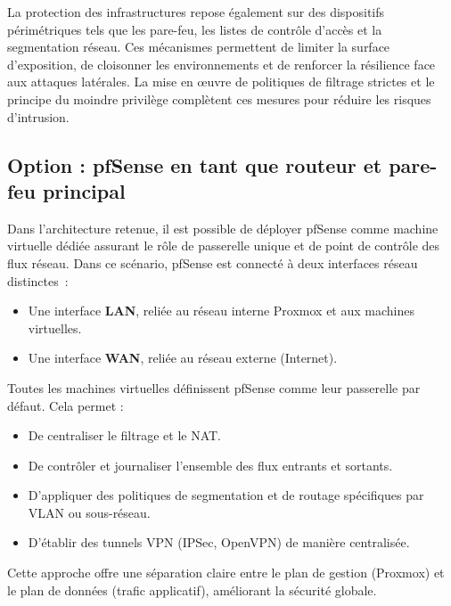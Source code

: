 La protection des infrastructures repose également sur des dispositifs périmétriques tels que les pare-feu, les listes de contrôle d’accès et la segmentation réseau. Ces mécanismes permettent de limiter la surface d’exposition, de cloisonner les environnements et de renforcer la résilience face aux attaques latérales. La mise en œuvre de politiques de filtrage strictes et le principe du moindre privilège complètent ces mesures pour réduire les risques d’intrusion.

\subsection{Option : pfSense en tant que routeur et pare-feu principal}

Dans l’architecture retenue, il est possible de déployer pfSense comme machine virtuelle dédiée assurant le rôle de passerelle unique et de point de contrôle des flux réseau. Dans ce scénario, pfSense est connecté à deux interfaces réseau distinctes~:
\begin{itemize}
	\item Une interface \textbf{LAN}, reliée au réseau interne Proxmox et aux machines virtuelles.
	\item Une interface \textbf{WAN}, reliée au réseau externe (Internet).
\end{itemize}

Toutes les machines virtuelles définissent pfSense comme leur passerelle par défaut. Cela permet :
\begin{itemize}
	\item De centraliser le filtrage et le NAT.
	\item De contrôler et journaliser l’ensemble des flux entrants et sortants.
	\item D’appliquer des politiques de segmentation et de routage spécifiques par VLAN ou sous-réseau.
	\item D’établir des tunnels VPN (IPSec, OpenVPN) de manière centralisée.
\end{itemize}

Cette approche offre une séparation claire entre le plan de gestion (Proxmox) et le plan de données (trafic applicatif), améliorant la sécurité globale.

